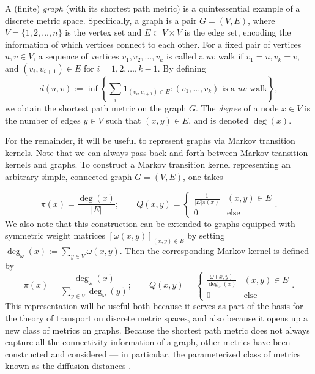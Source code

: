 \documentclass{article}
\begin{document}
A (finite) \emph{graph} (with its shortest path metric) is a quintessential example of a discrete metric space. Specifically, a graph is a pair \(G = (V,E)\), where \(V = \{1, 2, \dots, n\}\) is the vertex set and \(E \subset V \times V\) is the edge set, encoding the information of which vertices connect to each other.  For a fixed pair of vertices \(u,v\in V\), a sequence of vertices \(v_1, v_2, \dots, v_k\) is called a \(uv\) walk if \(v_1 = u, v_k=v,\) and \((v_i, v_{i+1}) \in E\) for \(i = 1, 2, \dots, k-1\). By defining
\[d(u,v) := \inf\left\{\sum\limits_{i} \mathbf{1}_{(v_i, v_{i+1})\in E} : (v_1, \dots, v_k) \text{ is a }uv \text{ walk}\right\},\]
we obtain the shortest path metric on the graph \(G\). The \emph{degree} of a node \(x \in V\) is the number of edges \(y \in V\) such that \((x,y) \in E\), and is denoted \(\deg(x)\).


For the remainder, it will be useful to represent graphs via Markov transition kernels. Note that we can always pass back and forth between Markov transition kernels and graphs. To construct a Markov transition kernel representing an arbitrary simple, connected graph \(G = (V,E)\), one takes

\begin{equation*}
  \pi(x) = \frac{\deg(x)}{|E|}; \qquad
  Q(x,y) = \begin{cases} 
    \frac{1}{|E|\pi(x)} & (x,y) \in E \\
    0 & \text{else}
  \end{cases}.
\end{equation*}
We also note that this construction can be extended to graphs equipped with symmetric weight matrices \([\omega(x,y)]_{(x,y) \in E}\) by setting \(\deg_{\omega}(x) := \sum_{y \in V} \omega(x,y)\). Then the corresponding Markov kernel is defined by 
\begin{equation*}
  \pi(x) = \frac{\deg_\omega(x)}{\sum_{y\in V}\deg_\omega(y)}; \qquad
  Q(x,y) = \begin{cases} 
    \frac{\omega(x,y)}{\deg_\omega(x)}& (x,y) \in E \\
    0 & \text{else}
  \end{cases}.
\end{equation*}
This representation will be useful both because it serves as part of the basis for the theory of transport on discrete metric spaces, and also because it opens up a new class of metrics on graphs. Because the shortest path metric does not always capture all the connectivity information of a graph, other metrics have been constructed and considered --- in particular, the parameterized class of metrics known as the diffusion distances \cite{coifmanDiffusionMaps2006, coifmanGeometricDiffusionsTool2005}.
\end{document}
